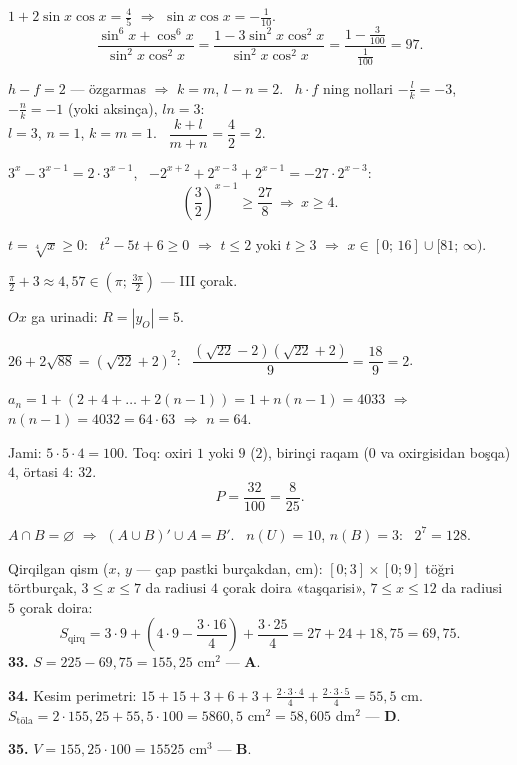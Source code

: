 $1+2\sin x\cos x=\frac45$ $\Rightarrow$ $\sin x\cos x=-\frac1{10}$.
\[\frac{\sin^6x+\cos^6x}{\sin^2x\cos^2x}=\frac{1-3\sin^2x\cos^2x}{\sin^2x\cos^2x}=\frac{1-\frac3{100}}{\frac1{100}}=97.\]

$h-f=2$ — özgarmas $\Rightarrow$ $k=m$, $l-n=2$. \ $h\cdot f$ ning nollari $-\frac lk=-3$, $-\frac nk=-1$ (yoki aksinça), $ln=3$:\\
$l=3$, $n=1$, $k=m=1$. \ $\dfrac{k+l}{m+n}=\dfrac42=2$.

$3^x-3^{x-1}=2\cdot3^{x-1}$, \ $-2^{x+2}+2^{x-3}+2^{x-1}=-27\cdot2^{x-3}$:
\[\left(\frac32\right)^{x-1}\ge\frac{27}8\ \Rightarrow\ x\ge4.\]

$t=\sqrt[4]x\ge0$: \ $t^2-5t+6\ge0$ $\Rightarrow$ $t\le2$ yoki $t\ge3$ $\Rightarrow$ $x\in[0;\,16]\cup[81;\,\infty)$.

$\frac\pi2+3\approx4{,}57\in\left(\pi;\,\frac{3\pi}2\right)$ — III çorak.

$Ox$ ga urinadi: $R=|y_O|=5$.

$26+2\sqrt{88}=\left(\sqrt{22}+2\right)^2$: \ $\dfrac{\left(\sqrt{22}-2\right)\left(\sqrt{22}+2\right)}9=\dfrac{18}9=2$.

$a_n=1+(2+4+\dots+2(n-1))=1+n(n-1)=4033$ $\Rightarrow$ $n(n-1)=4032=64\cdot63$ $\Rightarrow$ $n=64$.

Jami: $5\cdot5\cdot4=100$. Toq: oxiri $1$ yoki $9$ ($2$), birinçi raqam ($0$ va oxirgisidan boşqa) $4$, örtasi $4$: $32$.
\[P=\frac{32}{100}=\frac8{25}.\]

$A\cap B=\varnothing$ $\Rightarrow$ $(A\cup B)'\cup A=B'$. \ $n(U)=10$, $n(B)=3$: \ $2^7=128$.

\newpage
{}
Qirqilgan qism ($x$, $y$ — çap pastki burçakdan, cm): $[0;3]\times[0;9]$ töğri törtburçak, $3\le x\le7$ da radiusi $4$ çorak doira «taşqarisi», $7\le x\le12$ da radiusi $5$ çorak doira:
\[S_{\text{qirq}}=3\cdot9+\left(4\cdot9-\frac{3\cdot16}4\right)+\frac{3\cdot25}4=27+24+18{,}75=69{,}75.\]
\textbf{33.} $S=225-69{,}75=155{,}25$ cm$^2$ — \textbf{A}.

\textbf{34.} Kesim perimetri: $15+15+3+6+3+\frac{2\cdot3\cdot4}4+\frac{2\cdot3\cdot5}4=55{,}5$ cm.\\
$S_{\text{töla}}=2\cdot155{,}25+55{,}5\cdot100=5860{,}5$ cm$^2=58{,}605$ dm$^2$ — \textbf{D}.

\textbf{35.} $V=155{,}25\cdot100=15525$ cm$^3$ — \textbf{B}.

